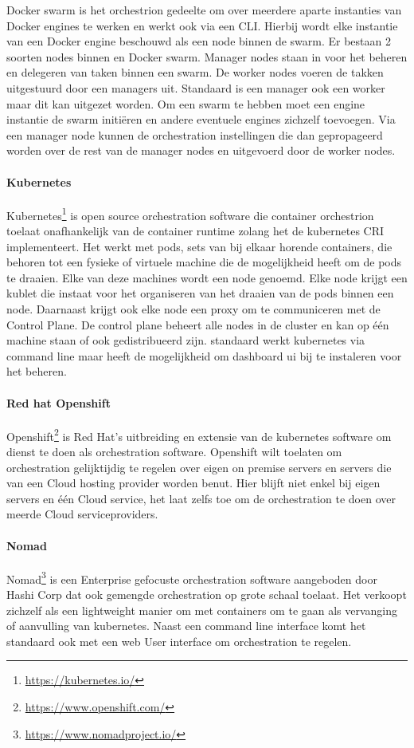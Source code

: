 Docker swarm is het orchestrion gedeelte om over meerdere aparte instanties van Docker engines te werken en werkt ook via een CLI. Hierbij wordt elke instantie van een Docker engine beschouwd als een node binnen de swarm. Er bestaan 2 soorten nodes binnen en Docker swarm. Manager nodes staan in voor het beheren en delegeren van taken binnen een swarm. De worker nodes voeren de takken uitgestuurd door een managers uit. Standaard is een manager ook een worker maar dit kan uitgezet worden. Om een swarm te hebben moet een engine instantie de swarm initiëren en andere eventuele engines zichzelf toevoegen. Via een manager node kunnen de orchestration instellingen die dan gepropageerd worden over de rest van de manager nodes en uitgevoerd door de worker nodes.
\paragraph{Kubernetes}
Kubernetes\footnote{\url{https://kubernetes.io/}} is open source orchestration software die container orchestrion toelaat onafhankelijk van de container runtime zolang het de kubernetes CRI implementeert. Het werkt met pods,  sets van bij elkaar horende containers, die behoren tot een fysieke of virtuele machine die de mogelijkheid heeft om de pods te draaien. Elke van deze machines wordt een node genoemd. Elke node krijgt een kublet die instaat voor het organiseren van het draaien van de pods binnen een node. Daarnaast krijgt ook elke node een proxy om te communiceren met de Control Plane. De control plane beheert alle nodes in de cluster en kan op één machine staan of ook gedistribueerd zijn.  standaard werkt kubernetes via command line maar heeft de mogelijkheid om dashboard ui bij te instaleren voor het beheren.
\paragraph{Red hat Openshift}
Openshift\footnote{\url{https://www.openshift.com/}} is Red Hat’s uitbreiding en extensie van de kubernetes software om dienst te doen als orchestration software. Openshift wilt toelaten om orchestration gelijktijdig te regelen over eigen on premise servers en servers die van een Cloud hosting provider worden benut. Hier blijft niet enkel bij eigen servers en één Cloud service, het laat zelfs toe om de orchestration te doen over meerde Cloud serviceproviders.
\paragraph{Nomad}
Nomad\footnote{\url{https://www.nomadproject.io/}} is een Enterprise gefocuste orchestration software aangeboden door Hashi Corp dat ook gemengde orchestration op grote schaal toelaat. Het verkoopt zichzelf als een lightweight manier om met containers om te gaan als vervanging of aanvulling van kubernetes. Naast een command line interface komt het standaard ook met een web User interface om orchestration te regelen.
